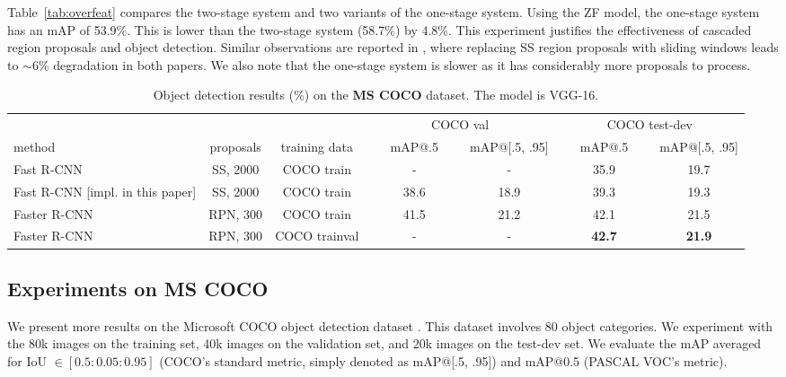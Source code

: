\documentclass[10pt,journal,cspaper,compsoc]{IEEEtran}
\begin{document}
Table~\ref{tab:overfeat} compares the two-stage system and two variants of the one-stage system. Using the ZF model, the one-stage system has an mAP of 53.9\%. This is lower than the two-stage system (58.7\%) by 4.8\%. This experiment justifies the effectiveness of cascaded region proposals and object detection. Similar observations are reported in \cite{Girshick2015a,Lenc2015}, where replacing SS region proposals with sliding windows leads to $\sim$6\% degradation in both papers.
We also note that the one-stage system is slower as it has considerably more proposals to process.

\setlength{\tabcolsep}{2pt}
\renewcommand{\arraystretch}{1.1}
\begin{table*}[t]
\begin{center}
\caption{Object detection results (\%) on the \textbf{MS COCO} dataset. The model is VGG-16.}
\vspace{-1em}
\small
\begin{tabular}{l|c|c|c|c|c|c}
       &           &               & \multicolumn{2}{c|}{COCO val} & \multicolumn{2}{c}{COCO test-dev}\\\cline{4-7}
method & proposals & training data & ~~~mAP@.5~~~ & mAP@[.5, .95]  & ~~~mAP@.5~~~ & mAP@[.5, .95] \\
\hline\hline
Fast R-CNN \cite{Girshick2015a} & SS, 2000 & COCO train & - & - & 35.9 & 19.7 \\
Fast R-CNN \footnotesize [impl. in this paper] & SS, 2000 & COCO train & 38.6 & 18.9 & 39.3 & 19.3\\
\hline
Faster R-CNN & RPN, 300 & COCO train & 41.5 & 21.2 & 42.1 & 21.5 \\
Faster R-CNN & RPN, 300 & COCO trainval & - & - & \textbf{42.7} & \textbf{21.9} \\
\end{tabular}
\label{tab:coco}
\end{center}
\end{table*}

\subsection{Experiments on MS COCO}

We present more results on the Microsoft COCO object detection dataset \cite{Lin2014}. This dataset involves 80 object categories. We experiment with the 80k images on the training set, 40k images on the validation set, and 20k images on the test-dev set.
We evaluate the mAP averaged for IoU $\in[0.5:0.05:0.95]$ (COCO's standard metric, simply denoted as mAP@[.5, .95]) and mAP@0.5 (PASCAL VOC's metric).
\end{document}
